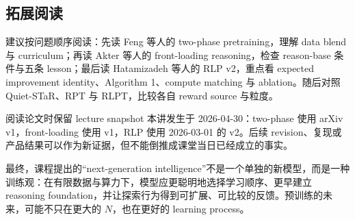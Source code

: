 \subsection{拓展阅读}

建议按问题顺序阅读：先读 Feng 等人的 two-phase pretraining，理解 data blend 与 curriculum；再读 Akter 等人的 front-loading reasoning，检查 reason-base 条件与五条 lesson；最后读 Hatamizadeh 等人的 RLP v2，重点看 expected improvement identity、Algorithm 1、compute matching 与 ablation。随后对照 Quiet-STaR、RPT 与 RLPT，比较各自 reward source 与粒度。

\begin{warningbox}{阅读论文时保留 lecture snapshot}
本讲发生于 2026-04-30：two-phase 使用 arXiv v1，front-loading 使用 v1，RLP 使用 2026-03-01 的 v2。后续 revision、复现或产品结果可以作为新证据，但不能倒推成课堂当日已经成立的事实。
\end{warningbox}

最终，课程提出的“next-generation intelligence”不是一个单独的新模型，而是一种训练观：在有限数据与算力下，模型应更聪明地选择学习顺序、更早建立 reasoning foundation，并让探索行为得到可扩展、可比较的反馈。预训练的未来，可能不只在更大的 $N$，也在更好的 learning process。


